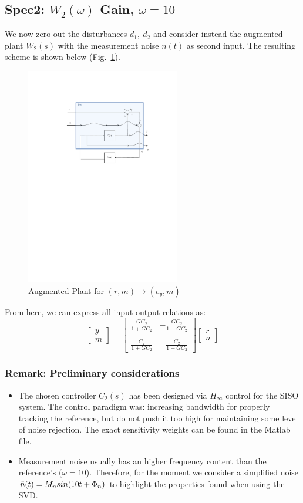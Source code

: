 \documentclass[a4paper, 12pt]{article}
\def\FigureFour{\centering\includegraphics[width=0.6\textwidth]{Figures/fig04.pdf}}
\begin{document}
\subsection{Spec2: $W_{2}(\omega)$ Gain, $\omega=10$}
We now zero-out the disturbances $d_1,\ d_2$ and consider instead the augmented plant $W_2(s)$ with the measurement noise $n(t)$ as second input. The resulting scheme is shown below (Fig.~\ref{fig:fig04}).
\begin{figure}[h!]
    \FigureFour
    \caption{Augmented Plant for $(r,m)\longrightarrow(e_y,m)$}
    \label{fig:fig04}
\end{figure}
From here, we can express all input-output relations as:
\begin{equation}
\begin{bmatrix}
y \\
m
\end{bmatrix}
=
\begin{bmatrix}
\frac{GC_2}{1+GC_2} & -\frac{GC_2}{1+GC_2} \\
\\
\frac{C_2}{1+GC_2} & -\frac{C_2}{1+GC_2}
\end{bmatrix}
\begin{bmatrix}
r \\
n
\end{bmatrix}
\label{eq:AugmentedPlant2}
\end{equation}
\subsubsection*{Remark: Preliminary considerations}
\begin{itemize}
\item The chosen controller $C_2(s)$ has been designed via $H_\infty$ control for the SISO system. The control paradigm was: increasing bandwidth for properly tracking the reference, but do not push it too high for maintaining some level of noise rejection. The exact sensitivity weights can be found in the Matlab file.
\item Measurement noise usually has an higher frequency content than the reference's ($\omega = 10$). Therefore, for the moment we consider a simplified noise  $\Tilde{n}(t) = M_nsin(10t+\Phi_n)$ to highlight the properties found when using the SVD.
\end{itemize}
\end{document}
